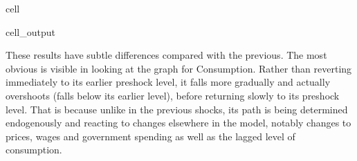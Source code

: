 \documentclass[letterpaper,10pt,english]{jupyterBook}
\begin{document}
\begin{sphinxuseclass}{cell}
\begin{sphinxVerbatimOutput}
\begin{sphinxuseclass}{cell_output}
\noindent{}

\end{sphinxuseclass}\end{sphinxVerbatimOutput}

\end{sphinxuseclass}
\sphinxAtStartPar
These results have subtle differences compared with the previous.  The most obvious is visible in looking at the graph for Consumption.  Rather than reverting immediately to its earlier pre\sphinxhyphen{}shock level, it falls more gradually and actually overshoots (falls below its earlier level), before returning slowly to its pre\sphinxhyphen{}shock level.  That is because unlike in the previous shocks, its path is being determined endogenously and reacting to changes elsewhere in the model, notably changes to prices, wages and government spending as well as the lagged level of consumption.
\end{document}

